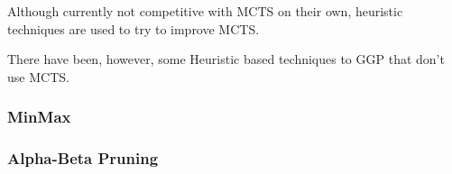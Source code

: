 Although currently not competitive with \gls{MCTS} on their own, heuristic techniques are used to try to improve \gls{MCTS}.

There have been, however, some Heuristic based techniques to \gls{GGP} that don't use \gls{MCTS}.

\subsubsection{MinMax}

\subsubsection{Alpha-Beta Pruning}

%
%
